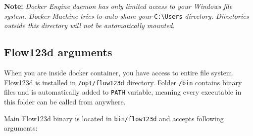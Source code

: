 \documentclass[12pt,a4paper]{report}
\begin{document}
\textbf{Note:}
\textit{Docker Engine daemon has only limited access to your Windows file system. Docker Machine tries to auto-share your}
\verb'C:\Users' \textit{directory. Directories outside this directory will not be automatically mounted.} 

\subsection{Flow123d arguments}
When you are inside docker container, you have access to entire file system. Flow123d is installed in 
\verb'/opt/flow123d' directory. Folder \verb'/bin' contains binary files and is automatically 
added to \verb'PATH' variable, meaning every executable in this folder can be called from anywhere.

Main Flow123d binary is located in \verb'bin/flow123d' and accepts following arguments:
\end{document}
